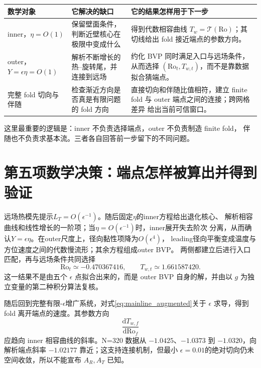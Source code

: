\documentclass[UTF8,zihao=-4,openany]{ctexbook}
\newcommand{\eps}{\epsilon}
\newcommand{\Ro}{\mathrm{Ro}}
\newcommand{\dd}{\mathrm{d}}
\newcommand{\Tcurve}{\mathcal T}
\begin{document}
\begin{center}
\begin{tabular}{p{}p{}p{}}
\toprule
数学对象 & 它解决的缺口 & 它的结果怎样用于下一步\\
\midrule
inner，$\eta=O(1)$ & 保留壁面条件，判断近壁核心在极限中变成什么 &
得到代数相容曲线 $T_w=\Tcurve(\Ro)$；其切线给出 fold 接近端点的参数方向。\\
outer，$Y=\eps\eta=O(1)$ & 解析不断增长的热--旋转尾，并连接到远场 &
约化 BVP 同时满足入口与远场条件，从而选择
$(\Ro_t,T_{w,t})$，而不是靠数据拟合猜端点。\\
完整 fold 切向与伴随 & 检查渐近方向是否真是有限问题的 fold 方向 &
直接切向和伴随比值相符，建立 finite fold 与 outer 端点之间的连接；跨网格差异
给出当前可信窗口。\\
\bottomrule
\end{tabular}
\end{center}

这里最重要的逻辑是：inner 不负责选择端点，outer 不负责制造 finite fold，
伴随也不负责求基本流。三者各自回答前一步留下的不同问题。

\section{第五项数学决策：端点怎样被算出并得到验证}

远场热模先提示$L_T=O(\eps^{-1})$。随后固定$\eta$的inner方程给出退化核心、
解析相容曲线和线性增长的一阶项；当$\eta=O(\eps^{-1})$时，inner展开失去阶次
分离，从而确认$Y=\eps\eta$。在outer尺度上，径向黏性项降为$O(\eps^4)$，
leading径向平衡变成温度与方位速度之间的代数慢流形；其余方程组成outer BVP。
两侧都建立后进行入口匹配，再与远场条件共同选择
\begin{equation}
 \Ro_t\simeq-0.470367416,\qquad T_{w,t}\simeq1.661587420.
\end{equation}
这一结果不是由五个 $\eps$ 点拟合出来的，而是 outer BVP 自身的解，并由以 $g$
为独立变量的第二种积分算法复核。

随后回到完整有限-$\eps$增广系统，对式\eqref{eq:mainline_augmented}关于 $\eps$
求导，得到 fold 离开端点的速度。其参数方向
\begin{equation}
 \frac{\dd T_{w,f}}{\dd\Ro_f}
\end{equation}
应趋向 inner 相容曲线的斜率。N=320 数据从 $-1.0425$、$-1.0373$ 到
$-1.0320$，向解析端点斜率 $-1.02177$ 靠近；这支持连接机制，但最小
$\eps=0.01$的绝对切向仍未空间收敛，所以不能宣布 $A_R,A_T$ 已知。
\end{document}

